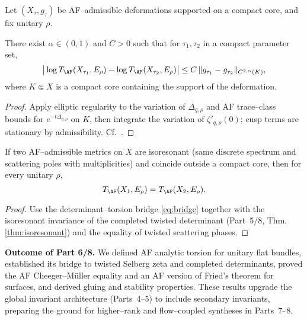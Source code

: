Let $(X_\tau,g_\tau)$ be AF–admissible deformations supported on a compact core, and fix unitary $\rho$.

\begin{proposition}
\label{prop:holder-torsion}
There exist $\alpha\in(0,1)$ and $C>0$ such that for $\tau_1,\tau_2$ in a compact parameter set,
\[
\big|\log T_{\AF}(X_{\tau_1},E_\rho)-\log T_{\AF}(X_{\tau_2},E_\rho)\big|
\le C\,\|g_{\tau_1}-g_{\tau_2}\|_{C^{2,\alpha}(K)},
\]
where $K\Subset X$ is a compact core containing the support of the deformation. %
\end{proposition}

\begin{proof}
Apply elliptic regularity to the variation of $\Delta_{q,\rho}$ and AF trace–class bounds for $e^{-t\Delta_{q,\rho}}$ on $K$, then integrate the variation of $\zeta'_{q,\rho}(0)$; cusp terms are stationary by admissibility. Cf.\ \cite{Muller1992,Borthwick}. %
\end{proof}

\begin{theorem}
\label{thm:isoresonant-torsion}
If two AF–admissible metrics on $X$ are isoresonant (same discrete spectrum and scattering poles with multiplicities) and coincide outside a compact core, then for every unitary $\rho$,
\[
T_{\AF}(X_1,E_\rho)=T_{\AF}(X_2,E_\rho).
\]
\end{theorem}

\begin{proof}
Use the determinant–torsion bridge \eqref{eq:bridge} together with the isoresonant invariance of the completed twisted determinant (Part~5/8, Thm.\ref{thm:isoresonant}) and the equality of twisted scattering phases. %
\end{proof}


\noindent\textbf{Outcome of Part 6/8.}
We defined AF analytic torsion for unitary flat bundles, established its bridge to twisted Selberg zeta and completed determinants, proved the AF Cheeger–M\"uller equality and an AF version of Fried's theorem for surfaces, and derived gluing and stability properties. These results upgrade the global invariant architecture (Parts~4–5) to include secondary invariants, preparing the ground for higher–rank and flow–coupled syntheses in Parts~7–8. %

